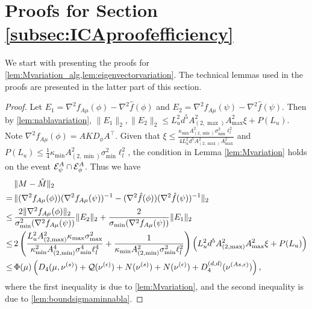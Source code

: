 \section{Proofs for Section \ref{subsec:ICAproofefficiency}}
\label{subsec:ProofEfficiency}
We start with presenting the proofs for \cref{lem:Mvariation_alg,lem:eigenvectorvariation}. 
The technical lemmas used in the proofs are presented in the latter part of this section. 
\ICAMvariationalg*
\begin{proof}
	Let $E_1 = \nabla^2 f_{A\mu}(\phi) - \nabla^2 \hat{f}(\phi)$ and $ E_2 = \nabla^2 f_{A\mu}(\psi) - \nabla^2 \hat{f}(\psi)$. Then by \cref{lem:nablavariation}, $\|E_1\|_2 , \|E_2\|_2 \le L_u^2d^5 A_{(2,\max)}^2A_{\max}^2\xi + P(L_u)$.
	Note $\nabla^2f_{A\mu}(\phi) = AKD_{\phi} A^{\top}$.
	Given that 
	$\xi \le  \frac{\kappa_{\min}A^2_{(2,\min)}\sigma_{\min}^2\ell_l^2}{4L_u^2d^5 A_{(2,\max)}^2A_{\max}^2}$ 
	and $P(L_u) \le \frac{1}{4}\kappa_{\min}A^2_{(2,\min)}\sigma_{\min}^2\ell_l^2$, the condition in Lemma \ref{lem:Mvariation} holds on the event $\mathcal{E}^A_{\psi}\cap\mathcal{E}^A_{\phi}$. 
	Thus we have
	\begin{align*}
	& \|M - \hat{M}\|_2 \\
	=\, & \|(\nabla^2 f_{A\mu}(\phi))(\nabla^2f_{A\mu}(\psi))^{-1} - (\nabla^2 \hat{f}(\phi))(\nabla^2\hat{f}(\psi))^{-1} \|_2 \\
	\le \, &\frac{2\|\nabla^2 f_{A\mu}(\phi)\|_2}{\sigma_{\min}^2(\nabla^2f_{A\mu}(\psi))}\|E_2\|_2 + \frac{2}{\sigma_{\min}(\nabla^2f_{A\mu}(\psi))}\|E_1\|_2 \\
	\le \, & 2\left( \frac{L_u^2A_{(2,\max)}^2\kappa_{\max}\sigma_{\max}^2}{\kappa^2_{\min}A^4_{(2,\min)}\sigma_{\min}^4\ell_l^4} + 
	\frac{1}{\kappa_{\min}A^2_{(2,\min)}\sigma_{\min}^2\ell_l^2}
	\right) \left(L_u^2d^5 A_{(2,\max)}^2A_{\max}^2\xi + P(L_u)\right) \\
	\le \, &\Phi(\mu)\left( D_4(\mu, \nu^{(s)} )+ \mathcal{Q}(\nu^{(\epsilon)}) + N(\nu^{(s)})+ N(\nu^{(\epsilon)})+ D_4^{(d,d)}(\nu^{(As,\epsilon)}) \right),
	\end{align*}
	where the first inequality is due to \cref{lem:Mvariation}, and the second inequality is due to \cref{lem:boundsigmaminnabla}.
\end{proof}

